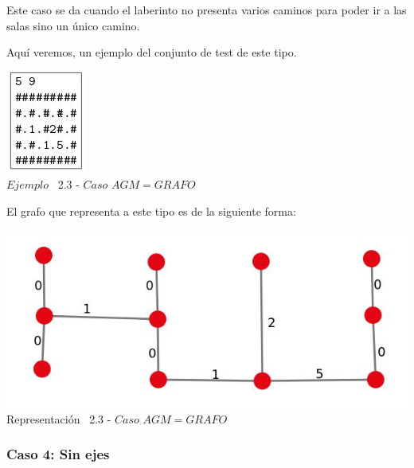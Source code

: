 Este caso se da cuando el laberinto no presenta varios caminos para poder ir a las salas sino un \'unico camino.

Aqu\'i veremos, un ejemplo del conjunto de test de este tipo.\\
 
\vspace*{0.3cm} \vspace*{0.3cm}
  \begin{center}
 \includegraphics[scale=1.6]{./EJ2/ej2completo.jpeg}
\\ {$Ejemplo$ \ 2.3 - $Caso$ $AGM = GRAFO$}
  \end{center}
  \vspace*{0.3cm}

El grafo que representa a este tipo es de la siguiente forma:\\

\vspace*{0.3cm} \vspace*{0.3cm}
  \begin{center}
 \includegraphics[scale=0.5]{./EJ2/ej2grafocompleto.jpeg}
 \\{Representación \ 2.3 - $Caso$ $AGM = GRAFO$}
  \end{center}
  \vspace*{0.3cm}

\begin{center}
 \subsubsection*{Caso 4: Sin ejes}
\end{center}

